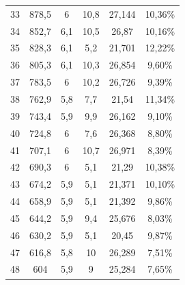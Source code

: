 \begin{longtable}{cccccc}
  33          & 878,5                & 6             & 10,8           & 27,144        & 10,36\%                            \\
  34          & 852,7                & 6,1           & 10,5           & 26,87         & 10,16\%                            \\
  35          & 828,3                & 6,1           & 5,2            & 21,701        & 12,22\%                            \\
  36          & 805,3                & 6,1           & 10,3           & 26,854        & 9,60\%                             \\
  37          & 783,5                & 6             & 10,2           & 26,726        & 9,39\%                             \\
  38          & 762,9                & 5,8           & 7,7            & 21,54         & 11,34\%                            \\
  39          & 743,4                & 5,9           & 9,9            & 26,162        & 9,10\%                             \\
  40          & 724,8                & 6             & 7,6            & 26,368        & 8,80\%                             \\
  41          & 707,1                & 6             & 10,7           & 26,971        & 8,39\%                             \\
  42          & 690,3                & 6             & 5,1            & 21,29         & 10,38\%                            \\
  43          & 674,2                & 5,9           & 5,1            & 21,371        & 10,10\%                            \\
  44          & 658,9                & 5,9           & 5,1            & 21,392        & 9,86\%                             \\
  45          & 644,2                & 5,9           & 9,4            & 25,676        & 8,03\%                             \\
  46          & 630,2                & 5,9           & 5,1            & 20,45         & 9,87\%                             \\
  47          & 616,8                & 5,8           & 10             & 26,289        & 7,51\%                             \\
  48          & 604                  & 5,9           & 9              & 25,284        & 7,65\%                             \\

\end{longtable}
